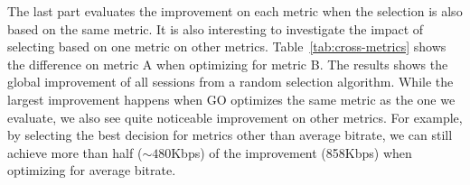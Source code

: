 \begin{figure}[h!]
\centering
{}
\hspace{-0.6cm}
\hspace{-0.6cm}
\hspace{-0.6cm}
\label{fig:improve}
\end{figure}


The last part evaluates the improvement on each metric when the selection is also based on the same metric. It is also interesting to investigate the impact of selecting based on one metric on other metrics. Table~\ref{tab:cross-metrics} shows the difference on metric A when optimizing for metric B. The results shows the global improvement of all sessions from a random selection algorithm. 
While the largest improvement happens when GO optimizes the same metric as the one we evaluate, we also see quite noticeable improvement on other metrics. For example, by selecting the best decision for metrics other than average bitrate, we can still achieve more than half ($\sim 480$Kbps) of the improvement (858Kbps) when optimizing for average bitrate.

